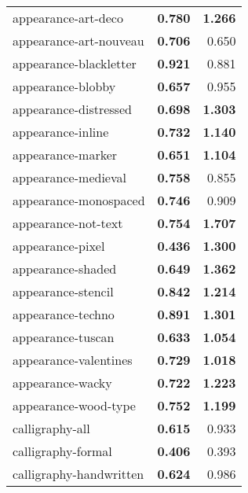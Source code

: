 \begin{longtable}{|l|r|r|}
appearance-art-deco       & \textbf{0.780}             & \textbf{1.266}          \\
appearance-art-nouveau    & \textbf{0.706}             & 0.650                   \\
appearance-blackletter    & \textbf{0.921}             & 0.881                   \\
appearance-blobby         & \textbf{0.657}             & 0.955                   \\
appearance-distressed     & \textbf{0.698}             & \textbf{1.303}          \\
appearance-inline         & \textbf{0.732}             & \textbf{1.140}          \\
appearance-marker         & \textbf{0.651}             & \textbf{1.104}          \\
appearance-medieval       & \textbf{0.758}             & 0.855                   \\
appearance-monospaced     & \textbf{0.746}             & 0.909                   \\
appearance-not-text       & \textbf{0.754}             & \textbf{1.707}          \\
appearance-pixel          & \textbf{0.436}             & \textbf{1.300}          \\
appearance-shaded         & \textbf{0.649}             & \textbf{1.362}          \\
appearance-stencil        & \textbf{0.842}             & \textbf{1.214}          \\
appearance-techno         & \textbf{0.891}             & \textbf{1.301}          \\
appearance-tuscan         & \textbf{0.633}             & \textbf{1.054}          \\
appearance-valentines     & \textbf{0.729}             & \textbf{1.018}          \\
appearance-wacky          & \textbf{0.722}             & \textbf{1.223}          \\
appearance-wood-type      & \textbf{0.752}             & \textbf{1.199}          \\
calligraphy-all           & \textbf{0.615}             & 0.933                   \\
calligraphy-formal        & \textbf{0.406}             & 0.393                   \\
calligraphy-handwritten   & \textbf{0.624}             & 0.986                   \\

\end{longtable}
